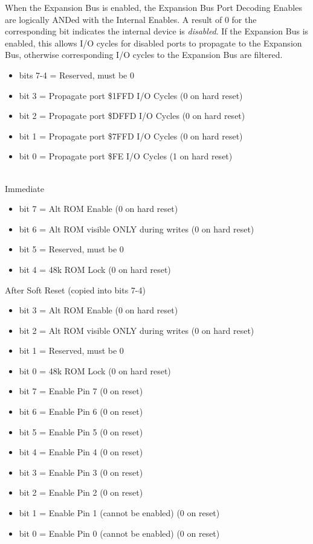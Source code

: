 When the Expansion Bus is enabled, the Expansion Bus Port Decoding
Enables are logically ANDed with the Internal Enables. A result of 0
for the corresponding bit indicates the internal device is
\emph{disabled}. If the Expansion Bus is enabled, this allows
I/O cycles for disabled ports to propagate to the Expansion Bus,
otherwise corresponding I/O cycles to the Expansion Bus are filtered.

\begin{itemize}
\item bits 7-4 = Reserved, must be 0
\item bit 3 = Propagate port \$1FFD I/O Cycles (0 on hard reset)
\item bit 2 = Propagate port \$DFFD I/O Cycles (0 on hard reset)
\item bit 1 = Propagate port \$7FFD I/O Cycles (0 on hard reset)
\item bit 0 = Propagate port \$FE I/O Cycles (1 on hard reset)
\end{itemize}

\\
Immediate
\begin{itemize}
\item bit 7 = Alt ROM Enable (0 on hard reset)
\item bit 6 = Alt ROM visible ONLY during writes (0 on hard reset)
\item bit 5 = Reserved, must be 0
\item bit 4 = 48k ROM Lock (0 on hard reset)
\end{itemize}
After Soft Reset (copied into bits 7-4)
\begin{itemize}
\item bit 3 = Alt ROM Enable (0 on hard reset)
\item bit 2 = Alt ROM visible ONLY during writes (0 on hard reset)
\item bit 1 = Reserved, must be 0
\item bit 0 = 48k ROM Lock (0 on hard reset)
\end{itemize}

\begin{itemize}
\item bit 7 = Enable Pin 7 (0 on reset)
\item bit 6 = Enable Pin 6 (0 on reset)
\item bit 5 = Enable Pin 5 (0 on reset)
\item bit 4 = Enable Pin 4 (0 on reset)
\item bit 3 = Enable Pin 3 (0 on reset)
\item bit 2 = Enable Pin 2 (0 on reset)
\item bit 1 = Enable Pin 1 (cannot be enabled) (0 on reset)
\item bit 0 = Enable Pin 0 (cannot be enabled) (0 on reset)
\end{itemize}

